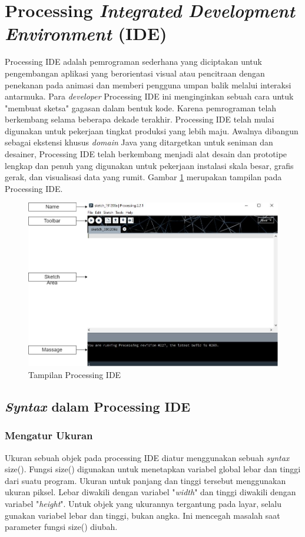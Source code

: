 \section{Processing \textit{Integrated Development Environment} (IDE)}
Processing IDE adalah pemrograman sederhana yang diciptakan untuk pengembangan aplikasi yang berorientasi visual atau pencitraan dengan penekanan pada animasi dan memberi pengguna umpan balik melalui interaksi antarmuka. Para \textit{developer} Processing IDE ini menginginkan sebuah cara untuk "membuat sketsa" gagasan dalam bentuk kode. Karena pemrograman telah berkembang selama beberapa dekade terakhir. Processing IDE telah mulai digunakan untuk pekerjaan tingkat produksi yang lebih maju. Awalnya dibangun sebagai ekstensi khusus \textit{domain} Java yang ditargetkan untuk seniman dan desainer, Processing IDE telah berkembang menjadi alat desain dan prototipe lengkap dan penuh yang digunakan untuk pekerjaan instalasi skala besar, grafis gerak, dan visualisasi data yang rumit. Gambar \ref{pic.processingide} merupakan tampilan pada Processing IDE.
	\begin{figure}[H]
	\centering
	\includegraphics[width=12cm]{gambar/processing_view.png}
	\caption{Tampilan Processing IDE}
	\label{pic.processingide}
	\end{figure}


\subsection{\textit{Syntax} dalam Processing IDE }

\subsubsection{Mengatur Ukuran}
Ukuran sebuah objek pada processing IDE diatur menggunakan sebuah \textit{syntax} size(). Fungsi size() digunakan untuk menetapkan variabel global lebar dan tinggi dari suatu program. Ukuran untuk panjang dan tinggi tersebut menggunakan ukuran piksel. Lebar diwakili dengan variabel "\textit{width}" dan tinggi diwakili dengan variabel "\textit{height}". Untuk objek yang ukurannya tergantung pada layar, selalu gunakan variabel lebar dan tinggi, bukan angka. Ini mencegah masalah saat parameter fungsi size() diubah.


